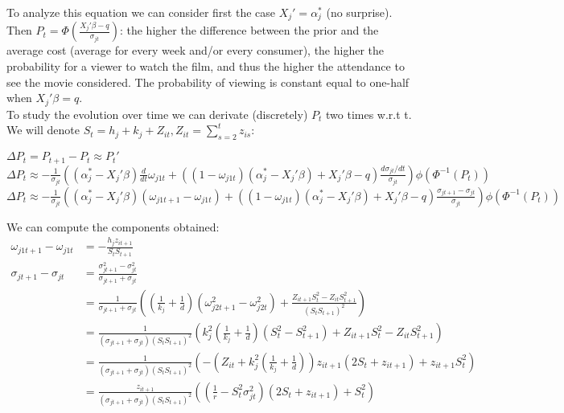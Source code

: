 	To analyze this equation we can consider first the case $X_{j}'=\alpha_{j}^{*}$ (no surprise). Then $P_{t}=\Phi\left(\frac{X_{j}'\beta-q}{\sigma_{j t}}\right)$: the higher the difference between the prior and the average cost (average for every week and/or every consumer), the higher the probability for a viewer to watch the film, and thus the higher the attendance to see the movie considered. The probability of viewing is constant equal to one-half when $X_{j}'\beta=q$.\\
	To study the evolution over time we can derivate (discretely) $P_{t}$ two times w.r.t t. We will denote $S_{t}=h_{j}+k_{j}+Z_{i t}, Z_{i t}=\sum_{s=2}^{t}z_{i s}$:
	\begin{center}	
		$\Delta P_{t}=P_{t+1}-P_{t}\approx P_{t}'$\\
		\medskip
		$\Delta P_{t}\approx -\frac{1}{\sigma_{j t}} \left((\alpha_{j}^{*}-X_{j}'\beta)\frac{d}{dt}\omega_{j 1 t}+((1-\omega_{j 1 t}) (\alpha_{j}^{*}-X_{j}'\beta)+X_{j}'\beta-q)\frac{d\sigma_{j t}/dt}{\sigma_{j t}}\right)\phi(\Phi^{-1}(P_{t}))$
		$\Delta P_{t}\approx -\frac{1}{\sigma_{j t}}\left((\alpha_{j}^{*}-X_{j}'\beta)(\omega_{j 1 t+1}-\omega_{j 1 t})+((1-\omega_{j 1 t}) (\alpha_{j}^{*}-X_{j}'\beta)+X_{j}'\beta-q)\frac{\sigma_{j t+1}-\sigma_{j t}}{\sigma_{j t}}\right)\phi(\Phi^{-1}(P_{t}))$
	\end{center}	
	We can compute the components obtained:
	\begin{align*}
		\omega_{j 1 t+1}-\omega_{j 1 t}&=-\frac{h_{j}z_{i t+1}}{S_{t}S_{t+1}}\\
		\sigma_{j t+1}-\sigma_{j t}&=\frac{\sigma_{j t+1}^{2}-\sigma_{j t}^{2}}{\sigma_{j t+1}+\sigma_{j t}}\\
		&=\frac{1}{\sigma_{j t+1}+\sigma_{j t}} \left(\left(\frac{1}{k_{j}}+\frac{1}{d}\right)(\omega_{j 2 t+1}^{2}-\omega_{j 2 t}^{2})+\frac{Z_{i t+1}S_{t}^{2}-Z_{i t}S_{t+1}^{2}}{(S_{t}S_{t+1})^{2}}\right)\\
		&=\frac{1}{(\sigma_{j t+1}+\sigma_{j t})(S_{t}S_{t+1})^{2}}\left(k_{j}^{2}\left(\frac{1}{k_{j}}+\frac{1}{d}\right)(S_{t}^{2}-S_{t+1}^{2})+Z_{i t+1}S_{t}^{2}-Z_{i t}S_{t+1}^{2}\right)\\
		&=\frac{1}{(\sigma_{j t+1}+\sigma_{j t})(S_{t}S_{t+1})^{2}}\left(-\left(Z_{i t}+k_{j}^{2}\left(\frac{1}{k_{j}}+\frac{1}{d}\right)\right)z_{i t+1}(2S_{t}+z_{i t+1})+z_{i t+1}S_{t}^{2}\right)\\
		&=\frac{z_{i t+1}}{(\sigma_{j t+1}+\sigma_{j t})(S_{t}S_{t+1})^{2}}\left(\left(\frac{1}{r}-S_{t}^{2}\sigma_{j t}^{2}\right)(2S_{t}+z_{i t+1})+S_{t}^{2}\right)
	\end{align*}	
